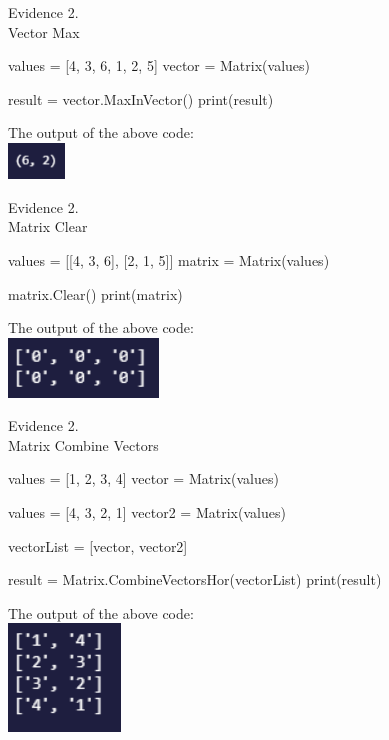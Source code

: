 \begin{center}
    {\large Evidence 2.\rn } \\ 
    \vspace{0.3cm}
    Vector Max \\
    \begin{pythoncode}
values = [4, 3, 6, 1, 2, 5]
vector = Matrix(values)

result = vector.MaxInVector()
print(result)
    \end{pythoncode}
    The output of the above code: \\
    \includegraphics[width=1.5cm]{Images/Testing/T2.16.1.PNG} \\
    \vspace{1cm}
    
    {\large Evidence 2.\rn } \\ 
    \vspace{0.3cm}
    Matrix Clear \\
    \begin{pythoncode}
values = [[4, 3, 6],
        [2, 1, 5]]
matrix = Matrix(values)

matrix.Clear()
print(matrix)
    \end{pythoncode}
    The output of the above code: \\
    \includegraphics[width=4cm]{Images/Testing/T2.17.1.PNG} \\
    \vspace{1cm}
    
    {\large Evidence 2.\rn } \\ 
    \vspace{0.3cm}
    Matrix Combine Vectors \\
    \begin{pythoncode}
values = [1, 2, 3, 4]
vector = Matrix(values)

values = [4, 3, 2, 1]
vector2 = Matrix(values)

vectorList = [vector, vector2]

result = Matrix.CombineVectorsHor(vectorList)
print(result)
    \end{pythoncode}
    The output of the above code: \\
    \includegraphics[width=3cm]{Images/Testing/T2.18.1.PNG} \\
    \vspace{1cm}
    

\end{center}
